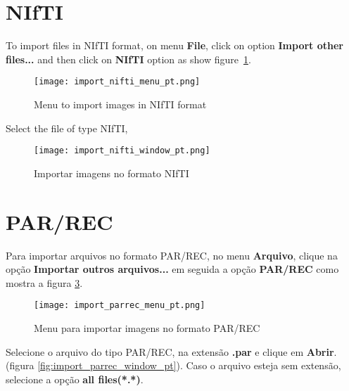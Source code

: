 \section{NIfTI}


To import files in NIfTI format, on menu \textbf{File}, click on option \textbf{Import other files...} and then click on \textbf{NIfTI} option as show figure~\ref{fig:import_nifti_menu_pt}.


\begin{figure}[!htb]
\centering
\texttt{[image: import\_nifti\_menu\_pt.png]}
\caption{Menu to import images in NIfTI format}
\label{fig:import_nifti_menu_pt}
\end{figure}


Select the file of type NIfTI, 


\begin{figure}[!htb]
\centering
\texttt{[image: import\_nifti\_window\_pt.png]}
\caption{Importar imagens no formato NIfTI}
\label{fig:import_nifti_window_pt}
\end{figure}

\section{PAR/REC}


Para importar arquivos no formato PAR/REC, no menu \textbf{Arquivo}, clique na opção \textbf{Importar outros arquivos...} em seguida a opção \textbf{PAR/REC} como mostra a figura \ref{fig:import_parrec_menu_pt}.

\begin{figure}[!htb]
\centering
\texttt{[image: import\_parrec\_menu\_pt.png]}
\caption{Menu para importar imagens no formato PAR/REC}
\label{fig:import_parrec_menu_pt}
\end{figure}

Selecione o arquivo do tipo PAR/REC, na extensão \textbf{.par} e clique em \textbf{Abrir}. (figura \ref{fig:import_parrec_window_pt}). Caso o arquivo esteja sem extensão, selecione a opção \textbf{all files(*.*)}.

